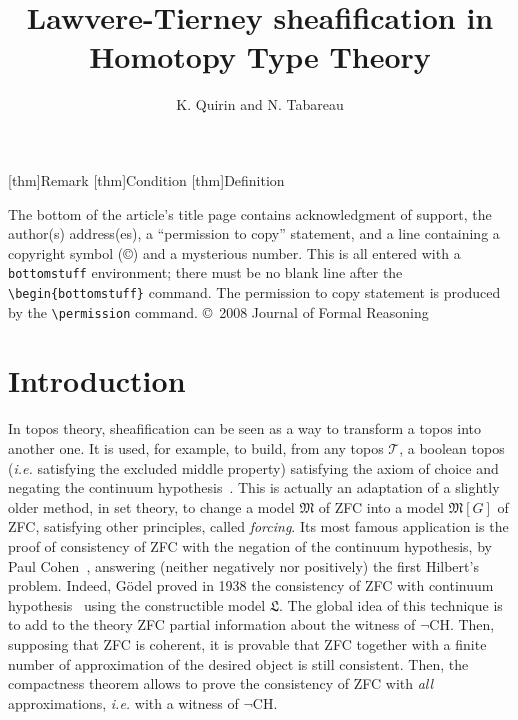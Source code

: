 \documentclass[notfinal]{jfrarticle}
\title{Lawvere-Tierney sheafification in Homotopy Type Theory}
\author{K. Quirin and N. Tabareau}
{Kevin Quirin\\ \'{E}cole des Mines de Nantes, France
  \and
  Nicolas Tabareau\\Inria, France}
\newcommand{\ie}{\emph{i.e.}}
\begin{document}
\newtheorem{thm}{Theorem}[section]
\newtheorem{prop}[thm]{Proposition}%
\newtheorem{lem}[thm]{Lemma}%
[thm]{Remark}%
[thm]{Condition}%
[thm]{Definition}%


\begin{bottomstuff}

The bottom of the article's title page contains acknowledgment of
support, the author(s) address(es), a ``permission to copy'' statement,
and a line containing a copyright symbol (\copyright) and a mysterious
number.  This is all entered with a {\tt bottomstuff} environment;
there must be no blank line after the \verb|\begin{bottomstuff}|
command.  The permission to copy statement is produced by the
\verb|\permission| command.
\permission
\copyright\ 2008 Journal of Formal Reasoning
\end{bottomstuff}

\maketitle

\section{Introduction}

In topos theory, sheafification can be seen as a way to transform a
topos into another one. It is used, for example, to build, from any
topos $\mathcal T$, a boolean topos (\ie{} satisfying the excluded
middle property) satisfying the axiom of choice and negating the
continuum hypothesis~\cite[Theorem VI.2.1]{maclanemoerdijk}.
This is actually an adaptation of a slightly older method, in set
theory, to change a model $\mathfrak M$ of ZFC into a model $\mathfrak
M[G]$ of ZFC, satisfying other principles, called {\em forcing}. Its
most famous application is the proof of consistency of ZFC with the
negation of the continuum hypothesis, by Paul Cohen~\cite{cohen1966},
answering (neither negatively nor positively) the first Hilbert's
problem. Indeed, Gödel proved in 1938 the consistency of ZFC with
continuum hypothesis~\cite{godel1938} using the constructible model
$\mathfrak L$.
The global idea of this technique is to add to the theory
ZFC partial information about the witness of $\lnot$CH. 
Then, supposing that ZFC is coherent, it is provable that ZFC together
with a finite number of approximation of the desired object is still
consistent. Then, the compactness theorem allows to prove the
consistency of ZFC with {\em all} approximations, \ie{} with a witness
of $\lnot$CH.
\end{document}
